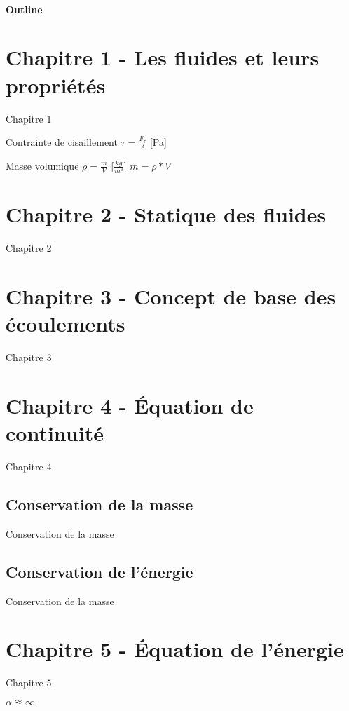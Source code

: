 \documentclass[12pt]{article}
\begin{document}
\maketitle

\paragraph{Outline}
\section{Chapitre 1 - Les fluides et leurs propriétés}
Chapitre 1

Contrainte de cisaillement
$\tau=\frac{F_{\tau}}{A}$ [Pa]

Masse volumique
$\rho=\frac{m}{V}$ [$\frac{kg}{m^3}$]
$m=\rho*V$


\section{Chapitre 2 - Statique des fluides}
Chapitre 2

\section{Chapitre 3 - Concept de base des écoulements}
Chapitre 3

\section{Chapitre 4 - Équation de continuité}
Chapitre 4
\subsection{Conservation de la masse}
Conservation de la masse

\subsection{Conservation de l'énergie}
Conservation de la masse

\section{Chapitre 5 - Équation de l'énergie}
Chapitre 5

$\alpha\approxeq\infty$
\end{document}
